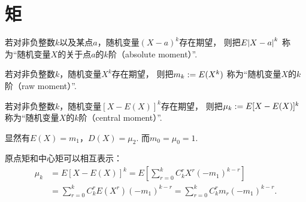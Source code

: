 \section{矩}
\begin{definition}
若对非负整数\(k\)以及某点\(a\)，随机变量\((X-a)^k\)存在期望，
则把\(E\abs{X-a}^k\)
称为“随机变量\(X\)的关于点\(a\)的\(k\)阶（absolute moment）”.
\end{definition}

\begin{definition}
若对非负整数\(k\)，随机变量\(X^k\)存在期望，
则把\(m_k := E(X^k)\)
称为“随机变量\(X\)的\(k\)阶（raw moment）”.
\end{definition}

\begin{definition}
若对非负整数\(k\)，随机变量\([X-E(X)]^k\)存在期望，
则把\(\mu_k := E[X-E(X)]^k\)
称为“随机变量\(X\)的\(k\)阶（central moment）”.
\end{definition}

显然有\(E(X) = m_1\)，\(D(X) = \mu_2\).
而\(m_0 = \mu_0 = 1\).

原点矩和中心矩可以相互表示：
\begin{align*}
	\mu_k &= E[X-E(X)]^k
	= E\left[ \sum_{r=0}^k{C_k^r X^r (-m_1)^{k-r}} \right] \\
	&= \sum_{r=0}^k{C_k^r E(X^r) (-m_1)^{k-r}}
	= \sum_{r=0}^k{C_k^r m_r (-m_1)^{k-r}}.
\end{align*}
